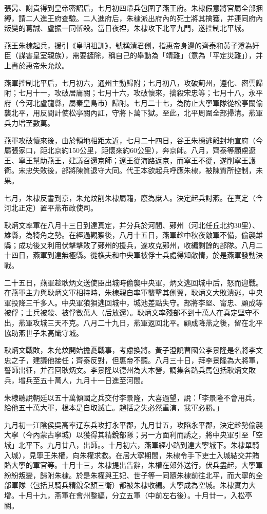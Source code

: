 張昺、謝貴得到皇帝密詔后，七月初四帶兵包圍了燕王府。朱棣假意將官屬全部捆縛，請二人進王府查驗。二人進府后，朱棣派出府內的死士將其擒獲，并連同府內叛變的葛誠、盧振一同斬殺。當日夜裡，朱棣攻下北平九門，遂控制北平城。

燕王朱棣起兵，援引《皇明祖訓》，號稱清君側，指惠帝身邊的齊泰和黃子澄為奸臣（謀害皇室親族），需要鏟除，稱自己的舉動為「靖難」（意為「平定災難」），并上書於惠帝朱允炆。

燕軍控制北平后，七月初六，通州主動歸附；七月初八，攻破薊州，遵化、密雲歸附；七月十一，攻破居庸關；七月十六，攻破懷來，擒殺宋忠等；七月十八，永平府（今河北盧龍縣，屬秦皇島市）歸附。七月二十七，為防止大寧軍隊從松亭關偷襲北平，用反間計使松亭關內訌，守將卜萬下獄。至此，北平周圍全部掃清。燕軍兵力增至數萬。

燕軍攻破懷來後，由於領地相距太近，七月二十四日，谷王朱橞逃離封地宣府（今屬張家口，距北京約150公里，距懷來約60公里），奔京師。八月，齊泰等顧慮遼王、寧王幫助燕王，建議召還京師；遼王從海路返京，而寧王不從，遂削寧王護衛。宋忠失敗後，部將陳質退守大同。代王本欲起兵呼應朱棣，被陳質所控制，未果。

七月，朱棣反書到京，朱允炆削朱棣屬籍，廢為庶人。決定起兵討燕。在真定（今河北正定）置平燕布政使司。

耿炳文率軍在八月十三日到達真定，并分兵於河間、鄚州（河北任丘北约30里）、雄縣，為犄角之勢。在經過觀察後，八月十五日，燕軍趁中秋夜敵軍不備，偷襲雄縣；成功後又利用伏擊擊敗了鄚州的援兵，遂攻克鄚州，收編剩餘的部隊。八月二十四日，燕軍到達無極縣。從樵夫和中央軍被俘士兵處得知敵情，於是燕軍發動決戰。

二十五日，燕軍趁耿炳文送使臣出城時偷襲中央軍，炳文逃回城中后，怒而迎戰。在燕軍主力與耿炳文軍相持時，朱棣親自率軍襲擊其側翼，耿炳文大敗潰逃，中央軍投降三千多人。中央軍狼狽逃回城中，城池差點失守。部將李堅、甯忠、顧成等被俘；士兵被殺、被俘數萬人（后放還）。耿炳文率殘部不到十萬人在真定堅守不出，燕軍攻城三天不克。八月二十九日，燕軍返回北平。顧成降燕之後，留在北平協助燕世子朱高熾守城。

耿炳文戰敗，朱允炆開始擔憂戰事，考慮換將。黃子澄說曹國公李景隆是名將李文忠之子，建議他接任；齊泰反對，但惠帝不聽。八月三十日，拜李景隆為大將軍，誓師出征，并召回耿炳文。李景隆以德州為大本營，調集各路兵馬包括耿炳文敗兵，增兵至五十萬人，九月十一日進至河間。

朱棣聽說朝廷以五十萬傾國之兵交付李景隆，大喜過望，說：「李景隆不會用兵，給他五十萬大軍，根本是自取滅亡。趙括之失必然重演，我軍必勝。」

九月初一江陰侯吳高率辽东兵攻打永平郡，九月廿五，攻陷永平郡，決定趁勢偷襲大寧（今內蒙古寧城）以獲得其精銳部隊；另一方面利而誘之，將中央軍引至「空城」北平下。九月廿八，出師。。十月初六，燕軍經小路到達大寧城下。朱棣單騎入城），見寧王朱權，向朱權求救。在居大寧期間，朱棣令手下吏士入城結交并賄賂大寧的軍官等。十月十三，朱棣提出告辭，朱權在郊外送行，伏兵盡起，大寧軍紛紛叛變，歸附朱棣。於是朱權與王妃、世子等一同隨朱棣前往北平，而大寧的全部軍隊（包括其騎兵精銳朵顏三衛）都被朱棣收編。大寧成為空城。朱棣實力大增。十月十九，燕軍在會州整編，分立五軍（中前左右後）。十月廿一，入松亭關。

